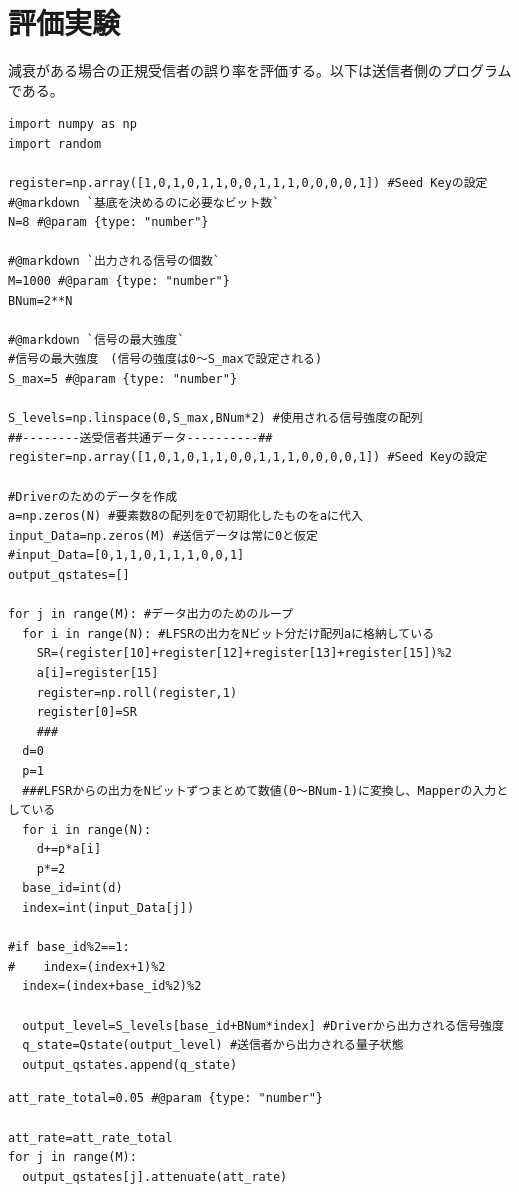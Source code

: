 \section{評価実験}
減衰がある場合の正規受信者の誤り率を評価する。以下は送信者側のプログラムである。
\begin{lstlisting}[caption=送信者側のプログラム,label=program1]
import numpy as np
import random

register=np.array([1,0,1,0,1,1,0,0,1,1,1,0,0,0,0,1]) #Seed Keyの設定
#@markdown `基底を決めるのに必要なビット数`
N=8 #@param {type: "number"}

#@markdown `出力される信号の個数`
M=1000 #@param {type: "number"}
BNum=2**N 

#@markdown `信号の最大強度`
#信号の最大強度　(信号の強度は0～S_maxで設定される)
S_max=5 #@param {type: "number"}

S_levels=np.linspace(0,S_max,BNum*2) #使用される信号強度の配列
##--------送受信者共通データ----------##
register=np.array([1,0,1,0,1,1,0,0,1,1,1,0,0,0,0,1]) #Seed Keyの設定

#Driverのためのデータを作成
a=np.zeros(N) #要素数8の配列を0で初期化したものをaに代入
input_Data=np.zeros(M) #送信データは常に0と仮定
#input_Data=[0,1,1,0,1,1,1,0,0,1]
output_qstates=[]

for j in range(M): #データ出力のためのループ
  for i in range(N): #LFSRの出力をNビット分だけ配列aに格納している
    SR=(register[10]+register[12]+register[13]+register[15])%2 
    a[i]=register[15] 
    register=np.roll(register,1) 
    register[0]=SR
    ###
  d=0
  p=1
  ###LFSRからの出力をNビットずつまとめて数値(0～BNum-1)に変換し、Mapperの入力としている
  for i in range(N):
    d+=p*a[i]
    p*=2 
  base_id=int(d)
  index=int(input_Data[j])

#if base_id%2==1:
#    index=(index+1)%2
  index=(index+base_id%2)%2

  output_level=S_levels[base_id+BNum*index] #Driverから出力される信号強度
  q_state=Qstate(output_level) #送信者から出力される量子状態
  output_qstates.append(q_state)
\end{lstlisting}

\begin{lstlisting}[caption=減衰のプログラム,label=program2]
att_rate_total=0.05 #@param {type: "number"}

att_rate=att_rate_total
for j in range(M):
  output_qstates[j].attenuate(att_rate)
\end{lstlisting}

